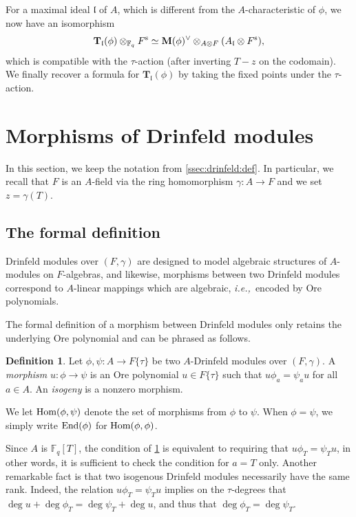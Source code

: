 \documentclass[11pt]{article}
\theoremstyle{definition}
\newtheorem{definition}[theorem]{Definition}
\newcommand\Fq{\mathbb{F}_q}
\newcommand{\Hom}{\text{\rm Hom}}
\newcommand\End{\text{\rm End}}
\newcommand{\MM}{\mathbf{M}}
\newcommand{\TT}{\mathbf{T}}
\newcommand{\fll}{\mathfrak{l}}
\newcommand{\Fs}{F^{\text{\rm s}}}
\newcommand{\ie}{\textit{i.e.,~}}
\begin{document}
For a maximal ideal $\fll$ of $A$, which is different from the
$A$-characteristic of $\phi$, we now have an isomorphism
\begin{equation}
\label{eq:motive:Tate}
\TT_\fll(\phi) \otimes_{\Fq} \Fs \simeq
  \MM(\phi)^\vee \otimes_{A \otimes F} (A_\fll \otimes \Fs),
\end{equation}
which is compatible with the $\tau$-action (after inverting
$T{-}z$ on the codomain).
We finally recover a formula for $\TT_\fll(\phi)$ by taking the
fixed points under the $\tau$-action.

\section{Morphisms of Drinfeld modules}
\label{ssec:drinfeld:morphisms}

In this section, we keep the notation from \cref{ssec:drinfeld:def}. In particular, we recall that $F$ is an $A$-field via the ring homomorphism $\gamma: A \rightarrow F$ and we set $z=\gamma(T)$.
\subsection{The formal definition}
\label{sssec:defmorphisms}

Drinfeld modules over $(F, \gamma)$ 
are designed to model algebraic structures of 
$A$-modules on $F$-algebras, and likewise, morphisms between two Drinfeld modules 
correspond to $A$-linear mappings which are algebraic, \ie encoded by Ore
polynomials.

The formal definition of a morphism between Drinfeld modules only
retains the underlying Ore polynomial and can be phrased as follows.

\begin{definition}
\label{def:morphism}
Let $\phi, \psi:A \to F\{\tau\}$ be two $A$-Drinfeld modules over 
$(F,\gamma)$.
A \emph{morphism} $u : \phi\to\psi$ is an Ore polynomial $u\in F\{\tau\}$ 
such that $u\phi_a=\psi_a u$ for all $a\in A$. An \emph{isogeny} is a 
nonzero morphism.

We let $\Hom(\phi,\psi)$ denote the set of morphisms from $\phi$
to $\psi$. When $\phi = \psi$, we simply write $\End(\phi)$ for
$\Hom(\phi,\phi)$.
\end{definition}

Since $A$ is $\Fq[T]$, the condition of \cref{def:morphism} is 
equivalent to requiring that $u\phi_T = \psi_T u$, in other words, it is sufficient to check the condition for $a = T$ only. Another remarkable fact is that two isogenous Drinfeld modules necessarily have the same rank. Indeed, the relation $u \phi_T =\psi_T u$ implies on the $\tau$-degrees 
that $\deg u + \deg \phi_T = \deg \psi_T + \deg u$, and thus that ${\deg 
\phi_T= \deg \psi_T}$.
\end{document}
